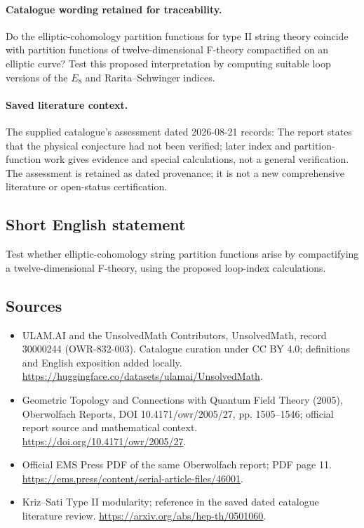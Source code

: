 \documentclass[11pt]{article}
\begin{document}
\paragraph{Catalogue wording retained for traceability.}
Do the elliptic-cohomology partition functions for type II string theory coincide with partition functions of twelve-dimensional F-theory compactified on an elliptic curve? Test this proposed interpretation by computing suitable loop versions of the $E_8$ and Rarita–Schwinger indices.

\paragraph{Saved literature context.} The supplied catalogue's assessment dated 2026-08-21 records: The report states that the physical conjecture had not been verified; later index and partition-function work gives evidence and special calculations, not a general verification. The assessment is retained as dated provenance; it is not a new comprehensive literature or open-status certification.
\subsection{Short English statement}
Test whether elliptic-cohomology string partition functions arise by compactifying a twelve-dimensional F-theory, using the proposed loop-index calculations.
\subsection{Sources}
\begin{itemize}
\item[\hypertarget{source:30000244:1}{S1}] ULAM.AI and the UnsolvedMath Contributors, UnsolvedMath, record 30000244 (OWR-832-003). Catalogue curation under CC BY 4.0; definitions and English exposition added locally.
\url{https://huggingface.co/datasets/ulamai/UnsolvedMath}.
\item[\hypertarget{source:30000244:2}{S2}] Geometric Topology and Connections with Quantum Field Theory (2005), Oberwolfach Reports, DOI 10.4171/owr/2005/27, pp. 1505--1546; official report source and mathematical context.
\url{https://doi.org/10.4171/owr/2005/27}.
\item[\hypertarget{source:30000244:3}{S3}] Official EMS Press PDF of the same Oberwolfach report; PDF page 11.
\url{https://ems.press/content/serial-article-files/46001}.
\item[\hypertarget{source:30000244:4}{S4}] Kriz--Sati Type II modularity; reference in the saved dated catalogue literature review.
\url{https://arxiv.org/abs/hep-th/0501060}.
\end{itemize}
\label{end:30000244}
\end{document}
